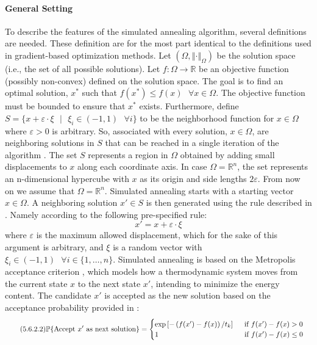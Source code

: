 \paragraph{General Setting}
To describe the features of the simulated annealing algorithm, several definitions are needed. These definition are for the most part identical to the definitions used in gradient-based optimization methods. Let $\left(\Omega,\left\Vert\cdot\right\Vert_{\Omega}\right)$ be the solution space (i.e., the set of all possible solutions). Let $f: \Omega \rightarrow \mathbb{R}$ be an objective function (possibly non-convex) defined on the solution space. The goal is to find an optimal solution, $x^{*}$ such that $f(x^{*}) \leq f(x) \text{ }\forall x \in \Omega.$ The objective function must be bounded to ensure that $x^{*}$ exists. Furthermore, define $S = \{x + \varepsilon\cdot\xi \text{ }|\text{ } \xi_{i} \in \left(-1, 1\right) \text{ } \forall i\}$ to be the neighborhood function for $x \in \Omega$ where $\varepsilon > 0$ is arbitrary. So, associated with every solution, $x \in \Omega$, are neighboring solutions in $S$ that can be reached in a single iteration of the algorithm \cite[2]{metropolis1953equation}. The set $S$ represents a region in $\Omega$ obtained by adding small displacements to $x$ along each coordinate axis. In case $\Omega = \mathbb{R}^n$, the set represents an n-dimensional hypercube with $x$ as its origin and side lengths $2\varepsilon.$ From now on we assume that $\Omega = \mathbb{R}^n.$ Simulated annealing starts with a starting vector $x \in \Omega.$ A neighboring solution $x' \in S$ is then generated using the rule described in \cite[2]{metropolis1953equation}. 
Namely according to the following pre-specified rule:
\begin{equation}\tag{5.6.2.1}
x' = x + \varepsilon\cdot\xi  
\end{equation}
where $\varepsilon$ is the maximum allowed displacement, which for the sake of this argument is arbitrary, and $\xi$ is a random vector with $\xi_{i} \in \left(-1,1\right)\text{ } \forall i \in \{1,\ldots,n\}.$ Simulated annealing is based on the Metropolis acceptance criterion \parencite[2]{metropolis1953equation}, which models how a thermodynamic system moves from the current state $x$ to the next state $x'$, intending to minimize the energy content. The candidate $x'$ is accepted as the new solution based on the acceptance probability provided in \cite[289]{Henderson2003}:
\begin{equation}\tag{5.6.2.2}
\mathbb{P}\{\text{Accept $x'$ as next solution}\} = 
    \begin{cases}
        \exp\left[-\left(f(x')-f(x)\right)/t_{k}\right] \hspace{0.5cm}\text{if $f(x')-f(x) > 0$}\\
        1 \text{\hspace{4.1cm} if $f(x')-f(x) \leq 0$}
    \end{cases}
\end{equation}
